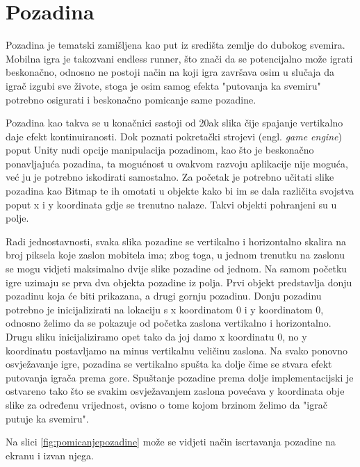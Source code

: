 \documentclass[times, utf8, zavrsni, numeric]{fer}
\begin{document}
	\section{Pozadina}
	Pozadina je tematski zamišljena kao put iz središta zemlje  do dubokog svemira. Mobilna igra je takozvani endless runner, što znači da se potencijalno može igrati beskonačno,
	odnosno ne postoji način na koji igra završava osim u slučaja da igrač izgubi sve živote, stoga je osim samog efekta "putovanja ka svemiru" potrebno osigurati i beskonačno pomicanje same pozadine.
	
	Pozadina kao takva se u konačnici sastoji od 20ak slika čije spajanje vertikalno daje efekt kontinuiranosti. Dok poznati pokretački strojevi (engl. \textit{game engine}) poput Unity nudi opcije manipulacija
	pozadinom, kao što je beskonačno ponavljajuća pozadina, ta mogućnost u ovakvom razvoju aplikacije nije moguća, već ju je potrebno iskodirati samostalno. 
	Za početak je potrebno učitati slike pozadina kao Bitmap te ih omotati u objekte kako bi im se dala različita svojstva poput x i y koordinata gdje se trenutno nalaze. Takvi objekti pohranjeni su u polje.
	
	Radi jednostavnosti, svaka slika pozadine se  vertikalno i horizontalno skalira na broj piksela koje zaslon mobitela ima; zbog toga, u jednom trenutku na zaslonu se mogu vidjeti maksimalno dvije slike
	pozadine od jednom. Na samom početku igre uzimaju se prva dva objekta pozadine iz polja. Prvi objekt predstavlja donju pozadinu koja će biti prikazana, a drugi gornju pozadinu.  Donju pozadinu potrebno je inicijalizirati
	na lokaciju s x koordinatom 0 i y koordinatom 0, odnosno želimo da se pokazuje od početka zaslona vertikalno i horizontalno. Drugu sliku inicijaliziramo opet tako da joj damo x koordinatu 0, no y koordinatu postavljamo
	na minus vertikalnu veličinu zaslona. Na svako ponovno osvježavanje igre, pozadina se vertikalno spušta ka dolje čime se stvara efekt putovanja igrača prema gore. Spuštanje pozadine prema dolje implementacijski je 
	ostvareno tako što se svakim osvježavanjem zaslona povećava y koordinata obje slike za određenu vrijednost, ovisno o tome kojom brzinom želimo da "igrač putuje ka svemiru". 
	
	Na slici \ref{fig:pomicanjepozadine} može se vidjeti način iscrtavanja pozadine na ekranu i izvan njega.
	
\end{document}
